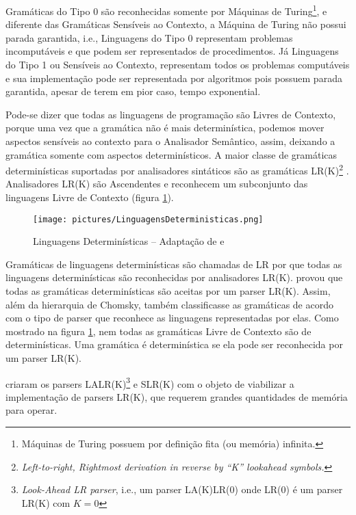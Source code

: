 {    Gramáticas do Tipo 0 são reconhecidas somente por Máquinas de Turing\footnote{Máquinas
    de Turing possuem por definição fita (ou memória) infinita.
    },
    e diferente das Gramáticas Sensíveis ao Contexto,
    a Máquina de Turing não possui parada garantida,
    i.e.,
    Linguagens do Tipo 0 representam problemas incomputáveis e
    que podem ser representados de procedimentos.
    Já Linguagens do Tipo 1 ou Sensíveis ao Contexto,
    representam todos os problemas computáveis e
    sua implementação pode ser representada por algoritmos pois possuem parada garantida,
    apesar de terem em pior caso,
    tempo exponential.

    Pode-se dizer que todas as linguagens de programação são Livres de Contexto,
    porque uma vez que a gramática não é mais determinística,
    podemos mover aspectos sensíveis ao contexto para o Analisador Semântico,
    assim,
    deixando a gramática somente com aspectos determinísticos.
    A maior classe de gramáticas determinísticas suportadas por analisadores
    sintáticos são as gramáticas LR(K)\footnote{\textit{Left-to-right,
    Rightmost derivation in reverse by ``K'' lookahead symbols.
    }} .
    Analisadores LR(K) são Ascendentes e
    reconhecem um subconjunto das linguagens Livre de Contexto
    (figura \ref{fig:pictures/LinguagensDeterministicas.png}).
    \begin{figure}[H]
    \centering
    \texttt{[image: pictures/LinguagensDeterministicas.png]}
    \caption{Linguagens Determinísticas -- Adaptação de  e }
    \label{fig:pictures/LinguagensDeterministicas.png}
    \end{figure}

    Gramáticas de linguagens determinísticas são chamadas de LR por que todas
    as linguagens determinísticas são reconhecidas por analisadores LR(K).
     provou que todas as gramáticas
    determinísticas são aceitas por um parser LR(K).
    Assim,
    além da hierarquia de Chomsky,
    também classificasse as gramáticas de acordo com o tipo de parser
    que reconhece as linguagens representadas por elas.
    Como mostrado na figura \ref{fig:pictures/LinguagensDeterministicas.png},
    nem todas as gramáticas Livre de Contexto são de determinísticas.
    Uma gramática é determinística se ela pode ser
    reconhecida por um parser LR(K).

     criaram os parsers LALR(K)\footnote{\textit{Look-Ahead LR parser},
    i.e.,
    um parser LA(K)LR(0) onde LR(0) é um parser LR(K) com $K=0$
    } e
    SLR(K) com o objeto de viabilizar a implementação de parsers LR(K),
    que requerem grandes quantidades de memória para operar.
}

